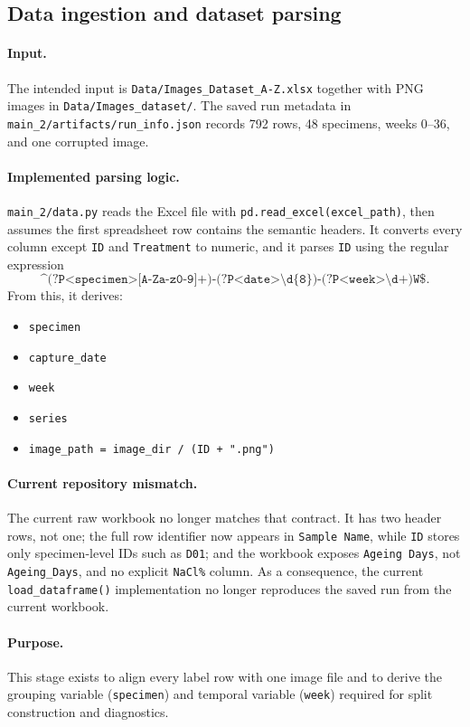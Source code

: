 \documentclass[11pt]{article}
\begin{document}
\subsection{Data ingestion and dataset parsing}
\paragraph{Input.}
The intended input is \texttt{Data/Images\_Dataset\_A-Z.xlsx} together with PNG images in \texttt{Data/Images\_dataset/}. The saved run metadata in \texttt{main\_2/artifacts/run\_info.json} records 792 rows, 48 specimens, weeks 0--36, and one corrupted image.

\paragraph{Implemented parsing logic.}
\texttt{main\_2/data.py} reads the Excel file with \texttt{pd.read\_excel(excel\_path)}, then assumes the first spreadsheet row contains the semantic headers. It converts every column except \texttt{ID} and \texttt{Treatment} to numeric, and it parses \texttt{ID} using the regular expression
\[
\texttt{\textasciicircum(?P<specimen>[A-Za-z0-9]+)-(?P<date>\textbackslash d\{8\})-(?P<week>\textbackslash d+)W\$}.
\]
From this, it derives:
\begin{itemize}
  \item \texttt{specimen}
  \item \texttt{capture\_date}
  \item \texttt{week}
  \item \texttt{series}
  \item \texttt{image\_path = image\_dir / (ID + ".png")}
\end{itemize}

\paragraph{Current repository mismatch.}
The current raw workbook no longer matches that contract. It has two header rows, not one; the full row identifier now appears in \texttt{Sample Name}, while \texttt{ID} stores only specimen-level IDs such as \texttt{D01}; and the workbook exposes \texttt{Ageing Days}, not \texttt{Ageing\_Days}, and no explicit \texttt{NaCl\%} column. As a consequence, the current \texttt{load\_dataframe()} implementation no longer reproduces the saved run from the current workbook.

\paragraph{Purpose.}
This stage exists to align every label row with one image file and to derive the grouping variable (\texttt{specimen}) and temporal variable (\texttt{week}) required for split construction and diagnostics.
\end{document}
